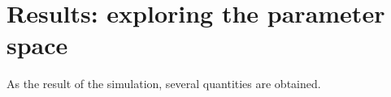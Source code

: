 \documentclass[useAMS,usenatbib]{mnras}
\begin{document}
%
%
%
%
%
%




\section{Results: exploring the parameter space}

As the result of the simulation, several quantities are obtained.
\end{document}
